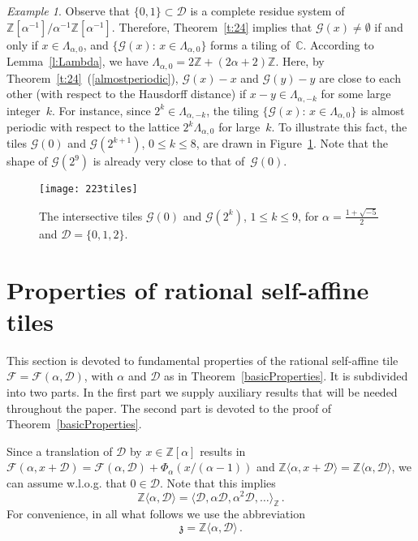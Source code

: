 \documentclass[12pt]{amsart}
\theoremstyle{definition}
\theoremstyle{remark}
\newtheorem{example}[lemma]{Example}
\numberwithin{equation}{section}
\begin{document}
\begin{example}
Observe that $\{0,1\} \subset \mathcal{D}$ is a complete residue system of $\mathbb{Z}[\alpha^{-1}]/\alpha^{-1}\mathbb{Z}[\alpha^{-1}]$.
Therefore, Theorem~\ref{t:24} implies that $\mathcal{G}(x) \ne \emptyset$ if and only if $x \in \Lambda_{\alpha,0}$, and  $\{\mathcal{G}(x):\, x \in \Lambda_{\alpha,0}\}$ forms a tiling of~$\mathbb{C}$.
According to Lemma~\ref{l:Lambda}, we have $\Lambda_{\alpha,0} = 2 \mathbb{Z} + (2\alpha+2) \mathbb{Z}$.
Here, by Theorem~\ref{t:24}~(\ref{almostperiodic}), $\mathcal{G}(x)-x$ and $\mathcal{G}(y)-y$ are close to each other (with respect to the Hausdorff distance) if $x-y \in \Lambda_{\alpha,-k}$ for some large integer~$k$.
For instance, since $2^k \in \Lambda_{\alpha,-k}$, the tiling $\{\mathcal{G}(x):\, x \in \Lambda_{\alpha,0}\}$ is almost periodic with respect to the lattice $2^k \Lambda_{\alpha,0}$ for large~$k$.
To illustrate this fact, the tiles $\mathcal{G}(0)$ and $\mathcal{G}(2^{k+1})$, $0 \le k \le 8$, are drawn in Figure~\ref{fig:223tiles}.
Note that the shape of $\mathcal{G}(2^9)$ is already very close to that of~$\mathcal{G}(0)$.
\begin{figure}[ht]
\texttt{[image: 223tiles]}
\caption{The intersective tiles $\mathcal{G}(0)$ and $\mathcal{G}(2^k)$, $1 \le k \le 9$, for $\alpha = \frac{1+\sqrt{-5}}{2}$ and $\mathcal{D} = \{0,1,2\}$.} \label{fig:223tiles}
\end{figure}
\end{example}

\section{Properties of rational self-affine tiles} \label{sec:prop-rati-self}

This section is devoted to fundamental properties of the rational self-affine tile $\mathcal{F} = \mathcal{F}(\alpha, \mathcal{D})$, with $\alpha$ and $\mathcal{D}$ as in Theorem~\ref{basicProperties}.
It is subdivided into two parts.
In the first part we supply auxiliary results that will be needed throughout the paper. The second part is devoted to the proof of Theorem~\ref{basicProperties}.

Since a translation of $\mathcal{D}$ by $x \in \mathbb{Z}[\alpha]$ results in $\mathcal{F}(\alpha, x+ \mathcal{D}) = \mathcal{F}(\alpha, \mathcal{D}) + \Phi_\alpha(x/(\alpha-1))$ and $\mathbb{Z}\langle \alpha, x + \mathcal{D}\rangle = \mathbb{Z}\langle \alpha, \mathcal{D}\rangle$, we can assume w.l.o.g. that $0 \in \mathcal{D}$.
Note that this implies
\[
\mathbb{Z}\langle \alpha, \mathcal{D}\rangle = \langle \mathcal{D}, \alpha \mathcal{D}, \alpha^2 \mathcal{D}, \ldots\rangle_{\mathbb{Z}}\,.
\]
For convenience, in all what follows we use the abbreviation
\[
\mathfrak{z} = \mathbb{Z}\langle \alpha, \mathcal{D}\rangle\,.
\]
\end{document}
